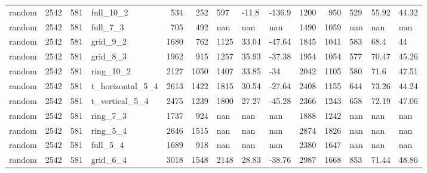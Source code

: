 \begin{longtable}{lrrlrrlllrrlll}
random & 2542 & 581 & full\_10\_2 & 534 & 252 & 597 & -11.8 & -136.9 & 1200 & 950 & 529 & 55.92 & 44.32 \\
random & 2542 & 581 & full\_7\_3 & 705 & 492 & nan & nan & nan & 1490 & 1059 & nan & nan & nan \\
random & 2542 & 581 & grid\_9\_2 & 1680 & 762 & 1125 & 33.04 & -47.64 & 1845 & 1041 & 583 & 68.4 & 44 \\
random & 2542 & 581 & grid\_8\_3 & 1962 & 915 & 1257 & 35.93 & -37.38 & 1954 & 1054 & 577 & 70.47 & 45.26 \\
random & 2542 & 581 & ring\_10\_2 & 2127 & 1050 & 1407 & 33.85 & -34 & 2042 & 1105 & 580 & 71.6 & 47.51 \\
random & 2542 & 581 & t\_horizontal\_5\_4 & 2613 & 1422 & 1815 & 30.54 & -27.64 & 2408 & 1155 & 644 & 73.26 & 44.24 \\
random & 2542 & 581 & t\_vertical\_5\_4 & 2475 & 1239 & 1800 & 27.27 & -45.28 & 2366 & 1243 & 658 & 72.19 & 47.06 \\
random & 2542 & 581 & ring\_7\_3 & 1737 & 924 & nan & nan & nan & 1888 & 1242 & nan & nan & nan \\
random & 2542 & 581 & ring\_5\_4 & 2646 & 1515 & nan & nan & nan & 2874 & 1826 & nan & nan & nan \\
random & 2542 & 581 & full\_5\_4 & 1689 & 918 & nan & nan & nan & 2380 & 1647 & nan & nan & nan \\
random & 2542 & 581 & grid\_6\_4 & 3018 & 1548 & 2148 & 28.83 & -38.76 & 2987 & 1668 & 853 & 71.44 & 48.86 \\
\end{longtable}
